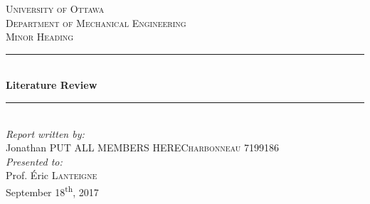 \documentclass[12pt]{article}
\begin{document}
	\begin{titlepage}
		
		\newcommand{\HRule}{\rule{\linewidth}{0.5mm}} %
		
		\begin{center} %
			
			
			\textsc{\LARGE University of Ottawa}\\[1.5cm] %
			\textsc{\Large Department of Mechanical Engineering}\\[1.5cm] %
			\textsc{\large Minor Heading}\\[1.5cm] %
			
			
			\HRule \\[0.4cm]
			{ \huge \bfseries Literature Review}\\[0.4cm] %
			\HRule \\[3cm]
			
			
			\emph{Report written by:}\\[1cm]
			Jonathan PUT ALL MEMBERS HERE\textsc{Charbonneau} 7199186\\[2cm]
			\emph{Presented to:}\\[0.5cm]
			Prof. Éric \textsc{Lanteigne}\\[3cm]
			
			
			
			{\large September 18\textsuperscript{th}, 2017}\\[2cm] %
			
			
			\vfill %
			
		\end{center}
		
	\end{titlepage}
	
	\renewcommand{\thepage}{\roman{page}}
	\newpage
	\tableofcontents
	\newpage
	\listoffigures
	\newpage
\end{document}
